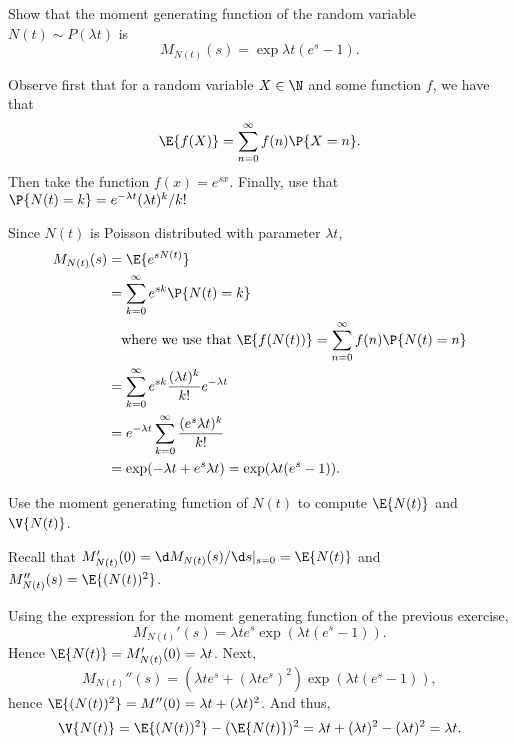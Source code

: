 \begin{exercise}
Show that the moment generating function of the random variable~$N(t)\sim P(\lambda t)$ is
\begin{equation*}
M_{N(t)}(s) 
= \exp{\lambda t(e^s-1)}.
\end{equation*}
  \begin{hint}Observe first that for a random variable $X\in\N$ and some function $f$, we have that
    \begin{equation*}
\E{f(X)}=\sum_{n=0}^\infty f(n) \P{X=n}.      
    \end{equation*}
Then take the function $f(x)=e^{s x}$. Finally, use that $\P{N(t)=k}=e^{-\lambda t}(\lambda t)^k/k!$
  \end{hint}
\begin{solution}
Since $N(t)$ is Poisson distributed with parameter $\lambda t$, 
\begin{align*}
M_{N(t)}(s)
&=  \E{e^{s N(t)}} \\
&= \sum_{k=0}^\infty e^{s k} \P{N(t)=k} \\
&\quad\text{where we use that $\E{f(N(t))}=\sum_{n=0}^\infty f(n) \P{N(t)=n}$}\\
&= \sum_{k=0}^\infty e^{s k} \frac{(\lambda t)^k}{k!} e^{-\lambda t}  \\
&= e^{-\lambda t} \sum_{k=0}^\infty  \frac{(e^s \lambda t)^k}{k!}  \\
&= \exp(-\lambda t + e^s \lambda t) =\exp(\lambda t(e^s - 1)).
\end{align*}
\end{solution}
\end{exercise}

\begin{exercise}
Use  the moment generating function of $N(t)$ to compute $\E{N(t)}$ and $\V{N(t)}$. 
\begin{hint}
  Recall that $M_{N(t)}'(0) = \d M_{N(t)}(s)/\d s|_{s=0} = \E{N(t)}$ and $M_{N(t)}''(s)= \E{(N(t))^2}$. 
\end{hint}
\begin{solution}
Using the expression for the moment generating function of the previous exercise,
  \begin{equation*}
    M_{N(t)}'(s) = \lambda t e^s \exp(\lambda t(e^s - 1)).
  \end{equation*}
Hence $\E{N(t)} = M_{N(t)}'(0) = \lambda t $. Next, 
  \begin{equation*}
    M_{N(t)}''(s) = (\lambda t e^s + (\lambda t e^s)^2) \exp(\lambda t(e^s - 1)),
  \end{equation*}
hence $\E{(N(t))^2} = M''(0) = \lambda t + (\lambda t)^2$. And thus, 
\begin{equation*}
\V{N(t)} =\E{(N(t))^2}-(\E{N(t)})^2 = \lambda t + (\lambda t)^2 - (\lambda t)^2 = \lambda t.
\end{equation*}
\end{solution}
\end{exercise}

